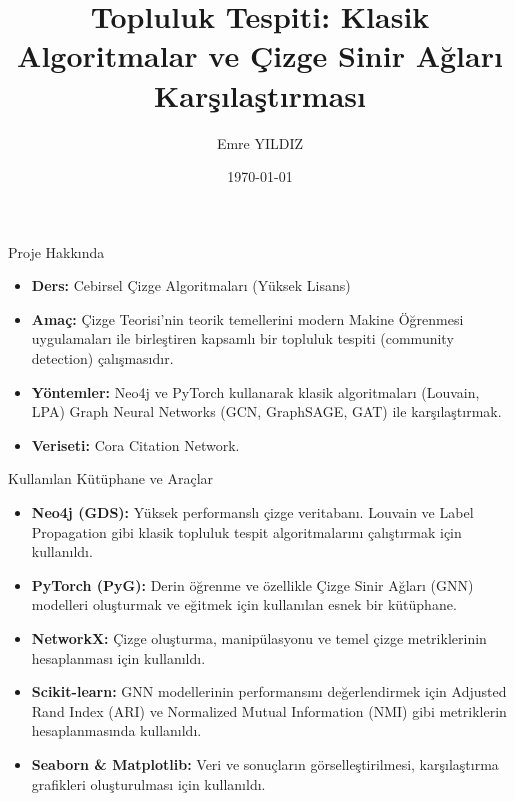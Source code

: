 \documentclass{beamer}
\title{Topluluk Tespiti: Klasik Algoritmalar ve Çizge Sinir Ağları Karşılaştırması}
\author{Emre YILDIZ}
\institute{Ege Üniversitesi \\ Bilgisayar Mühendisliği Bölümü}
\date{\today}
\begin{document}
\begin{frame}
    \titlepage
\end{frame}

\begin{frame}{Proje Hakkında}
    \begin{itemize}
        \item \textbf{Ders:} Cebirsel Çizge Algoritmaları (Yüksek Lisans)
        \item \textbf{Amaç:} Çizge Teorisi'nin teorik temellerini modern Makine Öğrenmesi uygulamaları ile birleştiren kapsamlı bir topluluk tespiti (community detection) çalışmasıdır.
        \item \textbf{Yöntemler:} Neo4j ve PyTorch kullanarak klasik algoritmaları (Louvain, LPA) Graph Neural Networks (GCN, GraphSAGE, GAT) ile karşılaştırmak.
        \item \textbf{Veriseti:} Cora Citation Network.
    \end{itemize}
\end{frame}

\begin{frame}{Kullanılan Kütüphane ve Araçlar}
    \begin{itemize}
        \item \textbf{Neo4j (GDS):} Yüksek performanslı çizge veritabanı. Louvain ve Label Propagation gibi klasik topluluk tespit algoritmalarını çalıştırmak için kullanıldı.
        \item \textbf{PyTorch (PyG):} Derin öğrenme ve özellikle Çizge Sinir Ağları (GNN) modelleri oluşturmak ve eğitmek için kullanılan esnek bir kütüphane.
        \item \textbf{NetworkX:} Çizge oluşturma, manipülasyonu ve temel çizge metriklerinin hesaplanması için kullanıldı.
        \item \textbf{Scikit-learn:} GNN modellerinin performansını değerlendirmek için Adjusted Rand Index (ARI) ve Normalized Mutual Information (NMI) gibi metriklerin hesaplanmasında kullanıldı.
        \item \textbf{Seaborn \& Matplotlib:} Veri ve sonuçların görselleştirilmesi, karşılaştırma grafikleri oluşturulması için kullanıldı.
    \end{itemize}
\end{frame}
\end{document}

